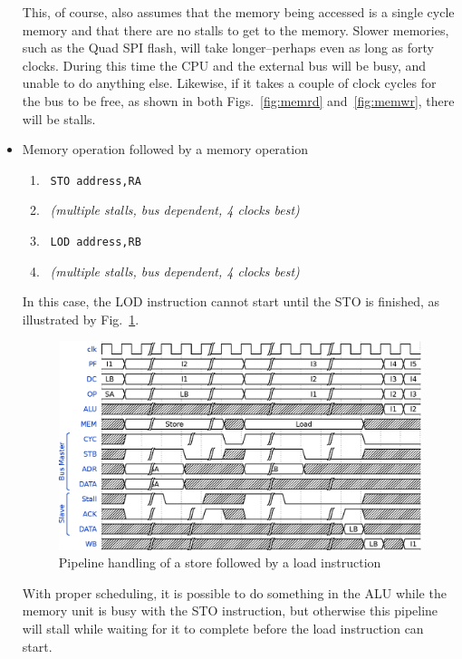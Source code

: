\documentclass{gqtekspec}
\begin{document}
\begin{itemize}
This, of course, also assumes that the memory being accessed is a single cycle
memory and that there are no stalls to get to the memory.
Slower memories, such as the Quad SPI flash, will take longer--perhaps even
as long as forty clocks.   During this time the CPU and the external bus 
will be busy, and unable to do anything else.  Likewise, if it takes a couple
of clock cycles for the bus to be free, as shown in both Figs.~\ref{fig:memrd}
and~\ref{fig:memwr}, there will be stalls.

\item Memory operation followed by a memory operation
\begin{enumerate}
\item\ {\tt STO address,RA}
\item\ {\em (multiple stalls, bus dependent, 4 clocks best)}
\item\ {\tt LOD address,RB}
\item\ {\em (multiple stalls, bus dependent, 4 clocks best)}
\end{enumerate}

In this case, the LOD instruction cannot start until the STO is finished,
as illustrated by Fig.~\ref{fig:mstld}.
\begin{figure}\begin{center}
\includegraphics[width=5.5in]{../gfx/mstld.eps}
\caption{Pipeline handling of a store followed by a load instruction}\label{fig:mstld}
\end{center}\end{figure}
With proper scheduling, it is possible to do something in the ALU while the
memory unit is busy with the STO instruction, but otherwise this pipeline will
stall while waiting for it to complete before the load instruction can
start.


\end{itemize}
\end{document}
